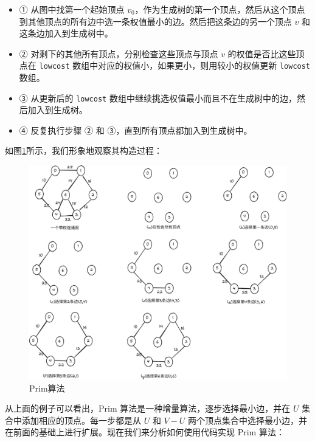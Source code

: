 \documentclass[lang=cn,newtx,10pt,scheme=chinese]{../elegantbook}
\begin{document}
\begin{itemize}
  \item ① 从图中找第一个起始顶点 $v_0$，作为生成树的第一个顶点，然后从这个顶点到其他顶点的所有边中选一条权值最小的边。然后把这条边的另一个顶点 $v$ 和这条边加入到生成树中。
  \item ② 对剩下的其他所有顶点，分别检查这些顶点与顶点 $v$ 的权值是否比这些顶点在 \texttt{lowcost} 数组中对应的权值小，如果更小，则用较小的权值更新 \texttt{lowcost} 数组。
  \item ③ 从更新后的 \texttt{lowcost} 数组中继续挑选权值最小而且不在生成树中的边，然后加入到生成树。
  \item ④ 反复执行步骤 ② 和 ③，直到所有顶点都加入到生成树中。
\end{itemize}

如图\ref{fig:prim}所示，我们形象地观察其构造过程：



\begin{figure}[!htbp]
  \centering
  \includegraphics[width=1\textwidth]{./figure/pdf/cropped/prime.pdf}
  \caption{Prim算法}
  \label{fig:prim}
\end{figure}

从上面的例子可以看出，Prim 算法是一种增量算法，逐步选择最小边，并在 $U$ 集合中添加相应的顶点。每一步都是从 $U$ 和 $V-U$ 两个顶点集合中选择最小边，并在前面的基础上进行扩展。现在我们来分析如何使用代码实现 Prim 算法：
\end{document}
